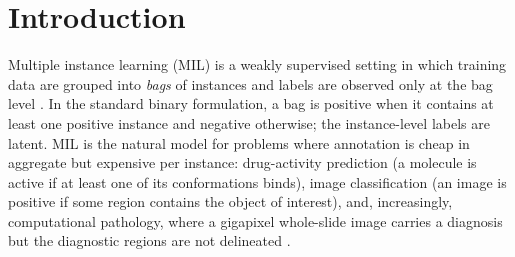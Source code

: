 \section{Introduction}
\label{sec:intro}

Multiple instance learning (MIL) is a weakly supervised setting in
which training data are grouped into \emph{bags} of instances and
labels are observed only at the bag level
\citep{dietterich1997solving,maron1998framework,andrews2003support}.
In the standard binary formulation, a bag is positive when it
contains at least one positive instance and negative otherwise; the
instance-level labels are latent. MIL is the natural model for
problems where annotation is cheap in aggregate but expensive per
instance: drug-activity prediction (a molecule is active if at least
one of its conformations binds), image classification (an image is
positive if some region contains the object of interest), and,
increasingly, computational pathology, where a gigapixel
whole-slide image carries a diagnosis but the diagnostic regions are
not delineated \citep{campanella2019clinical,lu2021data}.

